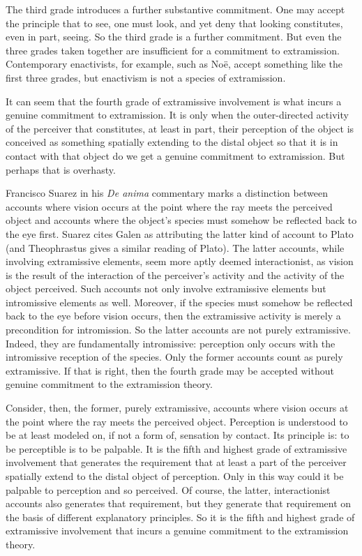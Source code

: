 \documentclass[12pt]{article}
\begin{document}
The third grade introduces a further substantive commitment. One may accept the principle that to see, one must look, and yet deny that looking constitutes, even in part, seeing. So the third grade is a further commitment. But even the three grades taken together are insufficient for a commitment to extramission. Contemporary enactivists, for example, such as Noë, accept something like the first three grades, but enactivism is not a species of extramission.

It can seem that the fourth grade of extramissive involvement is what incurs a genuine commitment to extramission. It is only when the outer-directed activity of the perceiver that constitutes, at least in part, their perception of the object is conceived as something spatially extending to the distal object so that it is in contact with that object do we get a genuine commitment to extramission. But perhaps that is overhasty.

Francisco Suarez in his \emph{De anima} commentary marks a distinction between accounts where vision occurs at the point where the ray meets the perceived object and accounts where the object's species must somehow be reflected back to the eye first. Suarez cites Galen as attributing the latter kind of account to Plato (and Theophrastus gives a similar reading of Plato). The latter accounts, while involving extramissive elements, seem more aptly deemed interactionist, as vision is the result of the interaction of the perceiver's activity and the activity of the object perceived. Such accounts not only involve extramissive elements but intromissive elements as well. Moreover, if the species must somehow be reflected back to the eye before vision occurs, then the extramissive activity is merely a precondition for intromission. So the latter accounts are not purely extramissive. Indeed, they are fundamentally intromissive: perception only occurs with the intromissive reception of the species. Only the former accounts count as purely extramissive. If that is right, then the fourth grade may be accepted without genuine commitment to the extramission theory.

Consider, then, the former, purely extramissive, accounts where vision occurs at the point where the ray meets the perceived object. Perception is understood to be at least modeled on, if not a form of, sensation by contact. Its principle is: to be perceptible is to be palpable. It is the fifth and highest grade of extramissive involvement that generates the requirement that at least a part of the perceiver spatially extend to the distal object of perception. Only in this way could it be palpable to perception and so perceived. Of course, the latter, interactionist accounts also generates that requirement, but they generate that requirement on the basis of different explanatory principles. So it is the fifth and highest grade of extramissive involvement that incurs a genuine commitment to the extramission theory. 
\end{document}
